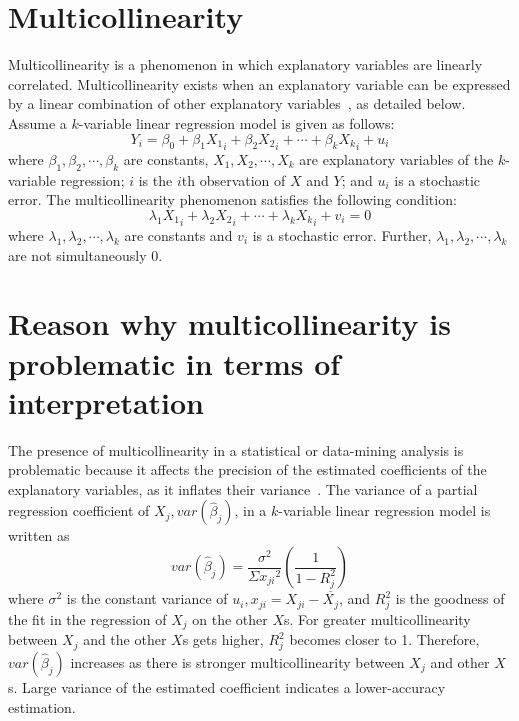 \section{ Multicollinearity}
\label{multicollinearity}
Multicollinearity is a phenomenon in which explanatory variables are linearly correlated. Multicollinearity exists when an explanatory variable can be expressed by a linear combination of other explanatory variables~\cite{gujarati2009basic}, as detailed below.
Assume a $k$-variable linear regression model is given as follows:
\begin{equation}
    Y_i = \beta_0 + \beta_1{X_1}_i + \beta_2{X_2}_i + \cdots + \beta_k{X_k}_i + u_i 
\end{equation}
where $ \beta_1, \beta_2, \cdots, \beta_k$ are constants, $X_1, X_2, \cdots, X_k$ are explanatory variables of the $ k $-variable regression; $i$ is the $i$th observation of $X$ and $Y$; and $u_i$ is a stochastic error.
The multicollinearity phenomenon satisfies the following condition:
\begin{equation}
    \lambda_1{X_1}_i + \lambda_2{X_2}_i + \cdots + \lambda_k{X_k}_i + v_i = 0 
\end{equation}
where $\lambda_1, \lambda_2, \cdots, \lambda_k$ are constants and $v_i$ is a stochastic error. Further, $\lambda_1, \lambda_2, \cdots, \lambda_k$ are not simultaneously 0.

\section{ Reason why multicollinearity is problematic in terms of interpretation} %
\label{mathematicalreason}
The presence of multicollinearity in a statistical or data-mining analysis is problematic because it affects the precision of the estimated coefficients of the explanatory variables, as it inflates their variance~\cite{gujarati2009basic}. The variance of a partial regression coefficient of $X_j, var(\hat{\beta}_j)$, in a $k$-variable linear regression model is written as
\begin{equation}
    var(\hat{\beta}_j) = \frac{\sigma^2}{\Sigma {x_{ji}}^2} ( \frac{1}{1-R_j^2} )
\end{equation}
where $\sigma^2$ is the constant variance of $u_i, {x_{ji}} = {X_{ji}} - \overline{X_j}$, and $R_j^2$ is the goodness of the fit in the regression of $X_j$ on the other $X$s.
For greater multicollinearity between $X_j$ and the other $X$s gets higher, $R_j^2$ becomes closer to 1. Therefore, $var(\hat{\beta}_j)$ increases as there is stronger multicollinearity between $X_j$ and other $X$s. Large variance of the estimated coefficient indicates a lower-accuracy estimation.

